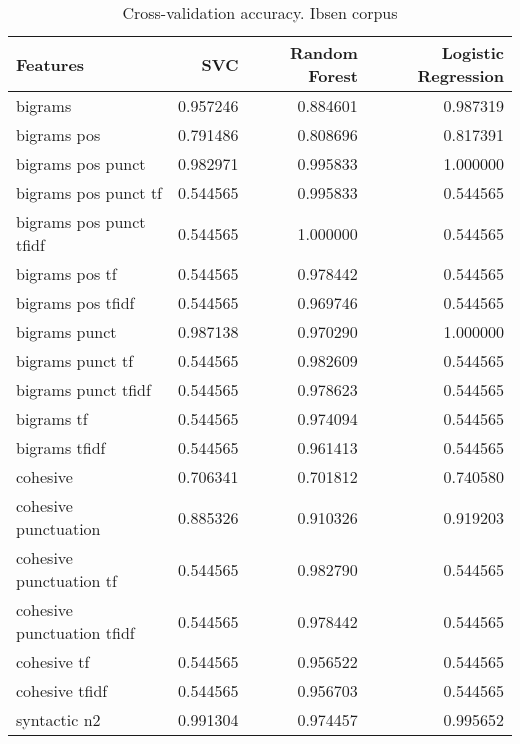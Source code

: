 \documentclass{article}
\begin{document}
\begin{table}
\centering
\caption{Cross-validation accuracy. Ibsen corpus}
\begin{tabular}{lrrr}
\toprule
{Features} &       SVC &  Random Forest &  Logistic Regression \\
\midrule
bigrams                    &  0.957246 &       0.884601 &             0.987319 \\
bigrams pos                &  0.791486 &       0.808696 &             0.817391 \\
bigrams pos punct          &  0.982971 &       0.995833 &             1.000000 \\
bigrams pos punct tf       &  0.544565 &       0.995833 &             0.544565 \\
bigrams pos punct tfidf    &  0.544565 &       1.000000 &             0.544565 \\
bigrams pos tf             &  0.544565 &       0.978442 &             0.544565 \\
bigrams pos tfidf          &  0.544565 &       0.969746 &             0.544565 \\
bigrams punct              &  0.987138 &       0.970290 &             1.000000 \\
bigrams punct tf           &  0.544565 &       0.982609 &             0.544565 \\
bigrams punct tfidf        &  0.544565 &       0.978623 &             0.544565 \\
bigrams tf                 &  0.544565 &       0.974094 &             0.544565 \\
bigrams tfidf              &  0.544565 &       0.961413 &             0.544565 \\
cohesive                   &  0.706341 &       0.701812 &             0.740580 \\
cohesive punctuation       &  0.885326 &       0.910326 &             0.919203 \\
cohesive punctuation tf    &  0.544565 &       0.982790 &             0.544565 \\
cohesive punctuation tfidf &  0.544565 &       0.978442 &             0.544565 \\
cohesive tf                &  0.544565 &       0.956522 &             0.544565 \\
cohesive tfidf             &  0.544565 &       0.956703 &             0.544565 \\
syntactic n2              &  0.991304 &       0.974457 &             0.995652 \\

\end{tabular}
\end{table}
\end{document}
